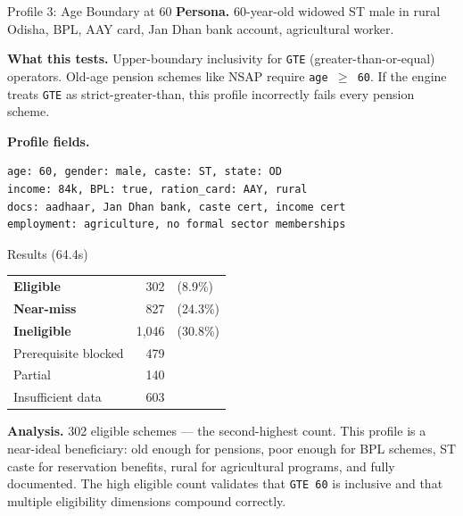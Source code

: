 \documentclass[11pt,a4paper]{article}
\newcommand{\ic}[1]{\texttt{\color{accent}#1}}
\begin{document}
\begin{profilebox}{Profile 3: Age Boundary at 60}
\textbf{Persona.} 60-year-old widowed ST male in rural Odisha, BPL, AAY card, Jan Dhan bank account, agricultural worker.

\textbf{What this tests.} Upper-boundary inclusivity for \ic{GTE} (greater-than-or-equal) operators. Old-age pension schemes like NSAP require \ic{age $\geq$ 60}. If the engine treats \ic{GTE} as strict-greater-than, this profile incorrectly fails every pension scheme.

\textbf{Profile fields.}
\begin{lstlisting}
age: 60, gender: male, caste: ST, state: OD
income: 84k, BPL: true, ration_card: AAY, rural
docs: aadhaar, Jan Dhan bank, caste cert, income cert
employment: agriculture, no formal sector memberships
\end{lstlisting}

\begin{resultbox}{Results (64.4s)}
\begin{tabular}{@{}lrl@{}}
  \textcolor{eligible}{\textbf{Eligible}} & 302 & (8.9\%) \\
  \textcolor{nearmiss}{\textbf{Near-miss}} & 827 & (24.3\%) \\
  \textcolor{inelig}{\textbf{Ineligible}} & 1{,}046 & (30.8\%) \\
  Prerequisite blocked & 479 & \\
  Partial & 140 & \\
  Insufficient data & 603 & \\
\end{tabular}
\end{resultbox}

\textbf{Analysis.} 302 eligible schemes --- the second-highest count. This profile is a near-ideal beneficiary: old enough for pensions, poor enough for BPL schemes, ST caste for reservation benefits, rural for agricultural programs, and fully documented. The high eligible count validates that \ic{GTE 60} is inclusive and that multiple eligibility dimensions compound correctly.
\end{profilebox}
\end{document}

